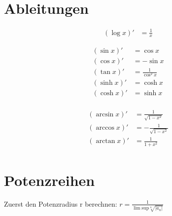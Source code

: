 \documentclass[a4paper,10pt]{article}
\DeclareMathOperator{\arcsinh}{arcsinh}
\DeclareMathOperator{\arccosh}{arccosh}
\DeclareMathOperator{\arctanh}{arctanh}
\begin{document}
\section{Ableitungen}

\begin{align*}
    (\log x)' &= \frac{1}{x}
\end{align*}

\begin{table}[ht]
\begin{minipage}[b]{0.5\linewidth}\centering
\begin{align*}
    (\sin x)'    &= \cos x \\
    (\cos x)'    &= -\sin x \\
    (\tan x)'    &= \frac{1}{\cos^2 x} \\
    (\sinh x)'   &= \cosh x \\
    (\cosh x)'   &= \sinh x \\
\end{align*}

\end{minipage}
\hspace{0.5cm}
\begin{minipage}[b]{0.5\linewidth}
\centering

\begin{align*}
    (\arcsin x)'  &=   \frac {1}{\sqrt{1-x^2}} \\
    (\arccos x)'  &= - \frac {1}{\sqrt{1-x^2}} \\
    (\arctan x)'  &=   \frac {1}{1 + x^2} \\
\end{align*}

\end{minipage}
\end{table}

\section{Potenzreihen}
Zuerst den Potenzradius r berechnen:
\(
    r = \frac {1}{\lim \text{sup} \sqrt[n]{|a_n|}}
\)
\end{document}
